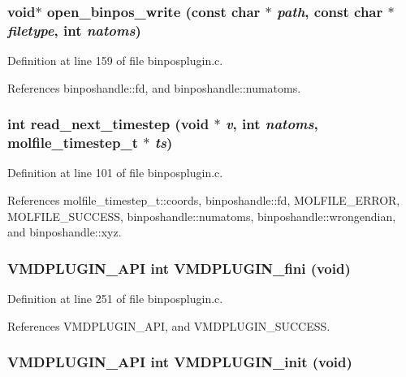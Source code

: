 \subsubsection{\setlength{\rightskip}{0pt plus 5cm}void$\ast$ open\_\-binpos\_\-write (const char $\ast$ {\em path}, const char $\ast$ {\em filetype}, int {\em natoms})\hspace{0.3cm}{\tt  [static]}}\label{binposplugin_8c_a4}




Definition at line 159 of file binposplugin.c.

References binposhandle::fd, and binposhandle::numatoms.
\subsubsection{\setlength{\rightskip}{0pt plus 5cm}int read\_\-next\_\-timestep (void $\ast$ {\em v}, int {\em natoms}, {\bf molfile\_\-timestep\_\-t} $\ast$ {\em ts})\hspace{0.3cm}{\tt  [static]}}\label{binposplugin_8c_a2}




Definition at line 101 of file binposplugin.c.

References molfile\_\-timestep\_\-t::coords, binposhandle::fd, MOLFILE\_\-ERROR, MOLFILE\_\-SUCCESS, binposhandle::numatoms, binposhandle::wrongendian, and binposhandle::xyz.
\subsubsection{\setlength{\rightskip}{0pt plus 5cm}VMDPLUGIN\_\-API int VMDPLUGIN\_\-fini (void)}\label{binposplugin_8c_a9}




Definition at line 251 of file binposplugin.c.

References VMDPLUGIN\_\-API, and VMDPLUGIN\_\-SUCCESS.
\subsubsection{\setlength{\rightskip}{0pt plus 5cm}VMDPLUGIN\_\-API int VMDPLUGIN\_\-init (void)}\label{binposplugin_8c_a7}




